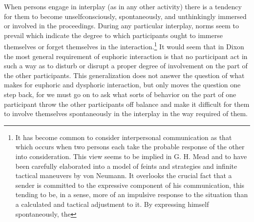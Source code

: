 \documentclass[twoside,symmetric,nobib,justified]{tufte-book}
\begin{document}
When persons engage in interplay (as in any other activity) there is a
tendency for them to become unselfconsciously, spontaneously, and
unthinkingly immersed or involved in the proceedings. During any
particular interplay, norms seem to prevail which indicate the degree to
which participants ought to immerse themselves or forget themselves in
the interaction.\footnote{It has become common to consider interpersonal
  communication as that which occurs when two persons each take the
  probable response of the other into consideration. This view seems to
  be implied in G. H. Mead and to have been carefully elaborated into a
  model of feints and strategies and infinite tactical maneuvers by von
  Neumann. It overlooks the crucial fact that a sender is committed to
  the expressive component of his communication, this tending to be, in
  a sense, more of an impulsive response to the situation than a
  calculated and tactical adjustment to it. By expressing himself spontaneously, the} It would seem that in Dixon the most
general requirement of euphoric interaction is that no participant act
in such a way as to disturb or disrupt a proper degree of involvement on
the part of the other participants. This generalization does not answer
the question of what makes for euphoric and dysphoric interaction, but
only moves the question one step back, for we must go on to ask what
sorts of behavior on the part of one participant throw the other
participants off balance and make it difficult for them to involve
themselves spontaneously in the interplay in the way required of them.
\end{document}

